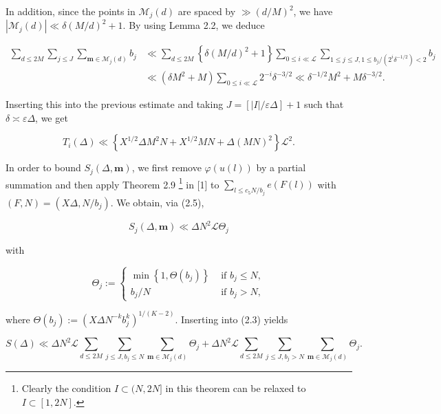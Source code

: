 \documentclass[10pt]{article}
\newcommand{\starfootnote}[1]{%
  \begingroup
  \renewcommand{\thefootnote}{\fnsymbol{footnote}}%
  \footnote[1]{#1}%
  \endgroup
}
\begin{document}
In addition, since the points in $\mathscr{M}_{j}(d)$ are spaced by $\gg(d/M)^2$, we have $\left|\mathscr{M}_{j}(d)\right| \ll \delta(M / d)^{2}+1$. By using Lemma 2.2, we deduce

$$
\begin{aligned}
\sum_{d \leqslant 2 M} \sum_{j \leqslant J} \sum_{\mathbf{m} \in \mathscr{M}_{j}(d)} b_{j} & \ll \sum_{d \leqslant 2 M}\left\{\delta(M / d)^{2}+1\right\} \sum_{0 \leqslant i \ll \mathscr{L}} \sum_{1 \leqslant j \leqslant J, 1\leqslant b_j/(2^i\delta^{-1/2})<2} b_{j} \\
& \ll\left(\delta M^{2}+M\right) \sum_{0 \leqslant i \ll \mathscr{L}} 2^{-i} \delta^{-3 / 2} \ll \delta^{-1 / 2} M^{2}+M \delta^{-3 / 2} .
\end{aligned}
$$

Inserting this into the previous estimate and taking $J=[|I| / \varepsilon \Delta]+1$ such that $\delta \asymp \varepsilon \Delta$, we get


\begin{equation*}
T_{i}(\Delta) \ll\left\{X^{1 / 2} \Delta M^{2} N+X^{1 / 2} M N+\Delta(M N)^{2}\right\} \mathscr{L}^{2} . \tag{2.8}
\end{equation*}


In order to bound $S_{j}(\Delta, \mathbf{m})$, we first remove $\varphi(u(l))$ by a partial summation and then apply Theorem 2.9\starfootnote{Clearly the condition $I\subset(N,2N]$ in this theorem can be relaxed to $I\subset[1,2N]$.} in [1] to $\sum_{l \leqslant c_{5} N / b_{j}} e(F(l))$ with $(F, N)=\left(X \Delta, N / b_{j}\right)$. We obtain, via (2.5),

$$
S_{j}(\Delta, \mathbf{m}) \ll \Delta N^{2} \mathscr{L} \Theta_{j}
$$

with

$$
\Theta_{j}:= \begin{cases}\min \left\{1, \Theta\left(b_{j}\right)\right\} & \text { if } b_{j} \leqslant N, \\ b_{j} / N & \text { if } b_{j}>N,\end{cases}
$$

where $\Theta\left(b_{j}\right):=\left(X \Delta N^{-k} b_{j}^{k}\right)^{1 /(K-2)}$. Inserting into (2.3) yields


\begin{equation*}
S(\Delta) \ll \Delta N^{2} \mathscr{L} \sum_{d \leqslant 2 M} \sum_{j \leqslant J, b_{j} \leqslant N} \sum_{\mathbf{m} \in \mathscr{M}_{j}(d)} \Theta_{j}+\Delta N^{2} \mathscr{L} \sum_{d \leqslant 2 M} \sum_{j \leqslant J, b_{j}>N} \sum_{\mathbf{m} \in \mathscr{M}_{j}(d)} \Theta_{j} . \tag{2.9}
\end{equation*}
\end{document}
